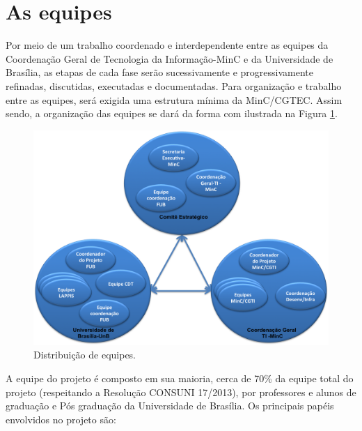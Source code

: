 \section{As equipes}

Por meio de um trabalho coordenado e interdependente entre as equipes da Coordenação Geral de Tecnologia da Informação-MinC 
e da Universidade de Brasília, as etapas de cada fase serão sucessivamente e progressivamente refinadas, discutidas, executadas e
documentadas.
Para organização e trabalho entre as equipes, será exigida uma estrutura mínima da MinC/CGTEC. Assim sendo, a organização das equipes se dará da forma com ilustrada na Figura \ref{figura-equipes}.

\begin{figure}[!htb]
\centering
\includegraphics[keepaspectratio=true,scale=0.6]{figuras/Equipes_FUB-MINC.png}
\caption{Distribuição de equipes.}
\label{figura-equipes}
\end{figure}


A equipe do projeto é composto em sua maioria, cerca de 70\% da equipe total do projeto (respeitando a Resolução CONSUNI 17/2013), 
por professores e alunos de graduação e Pós graduação da Universidade de Brasília.  Os principais papéis envolvidos no projeto são:

